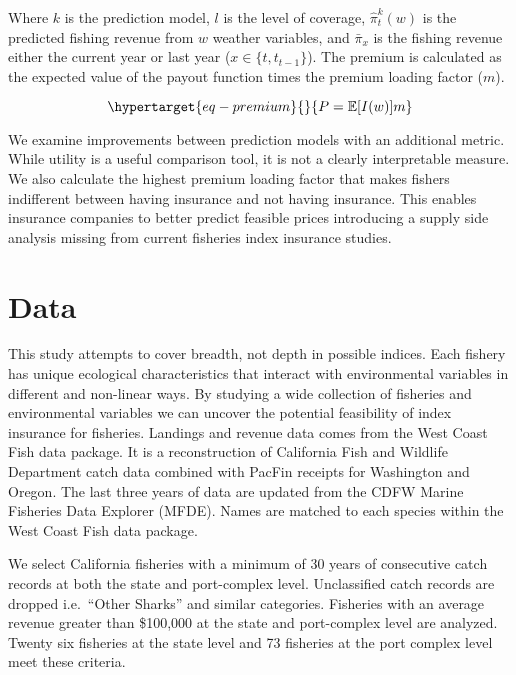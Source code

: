 \documentclass[
  letterpaper,
  DIV=11,
  numbers=noendperiod]{scrartcl}
\begin{document}
Where \(k\) is the prediction model, \(l\) is the level of coverage,
\(\hat\pi_t^k(w)\) is the predicted fishing revenue from \(w\) weather
variables, and \(\bar{\pi}_{x}\) is the fishing revenue either the
current year or last year (\(x\in\{t,t_{t-1}\}\)). The premium is
calculated as the expected value of the payout function times the
premium loading factor (\(m\)).

\begin{equation}\protect\hypertarget{eq-premium}{}{
P=\mathbb{E}[I(w)]m
}\label{eq-premium}\end{equation}

We examine improvements between prediction models with an additional
metric. While utility is a useful comparison tool, it is not a clearly
interpretable measure. We also calculate the highest premium loading
factor that makes fishers indifferent between having insurance and not
having insurance. This enables insurance companies to better predict
feasible prices introducing a supply side analysis missing from current
fisheries index insurance studies.

\hypertarget{data}{%
\section{Data}\label{data}}

This study attempts to cover breadth, not depth in possible indices.
Each fishery has unique ecological characteristics that interact with
environmental variables in different and non-linear ways. By studying a
wide collection of fisheries and environmental variables we can uncover
the potential feasibility of index insurance for fisheries. Landings and
revenue data comes from the West Coast Fish data package. It is a
reconstruction of California Fish and Wildlife Department catch data
combined with PacFin receipts for Washington and Oregon. The last three
years of data are updated from the CDFW Marine Fisheries Data Explorer
(MFDE). Names are matched to each species within the West Coast Fish
data package.

We select California fisheries with a minimum of 30 years of consecutive
catch records at both the state and port-complex level. Unclassified
catch records are dropped i.e.~``Other Sharks'' and similar categories.
Fisheries with an average revenue greater than \$100,000 at the state
and port-complex level are analyzed. Twenty six fisheries at the state
level and 73 fisheries at the port complex level meet these criteria.
\end{document}
